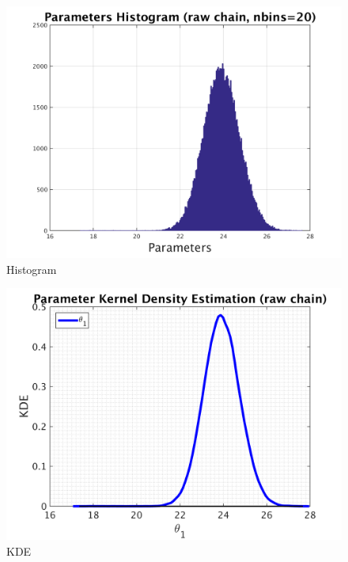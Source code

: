 \begin{figure}[H]
  
  \centering
   \includegraphics[scale=0.75]{100_results/outputData_100000/simple_ip_hist_raw}
   \caption{Histogram}
\end{figure}



\begin{figure}[H]
  
  \centering
   \includegraphics[scale=0.75]{100_results/outputData_100000/simple_ip_kde_raw}
   \caption{ KDE }
\end{figure}

